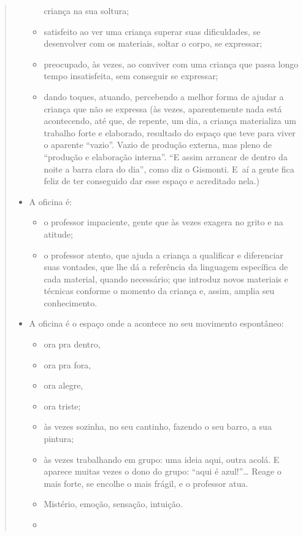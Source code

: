 \begin{quote}
\begin{itemize}
\begin{itemize}
    criança na sua soltura;
  \item
    satisfeito ao ver uma criança superar suas dificuldades, se
    desenvolver com os materiais, soltar o corpo, se expressar;
  \item
    preocupado, às vezes, ao conviver com uma criança que passa longo
    tempo insatisfeita, sem conseguir se expressar;
  \item
    dando toques, atuando, percebendo a melhor forma de ajudar a criança
    que não se expressa (às vezes, aparentemente nada está acontecendo,
    até que, de repente, um dia, a criança materializa um trabalho forte
    e elaborado, resultado do espaço que teve para viver o aparente
    ``vazio''. Vazio de produção externa, mas pleno de ``produção e
    elaboração interna''. ``E assim arrancar de dentro da noite a barra
    clara do dia'', como diz o Gismonti. E~aí a gente fica feliz de ter
    conseguido dar esse espaço e acreditado nela.)
  \end{itemize}
\item
  A oficina é:
  \begin{itemize}
  \item
    o professor impaciente, gente que às vezes exagera no grito e na
    atitude;
  \item
    o professor atento, que ajuda a criança a qualificar e diferenciar
    suas vontades, que lhe dá a referência da linguagem específica de
    cada material, quando necessário; que introduz novos materiais e
    técnicas conforme o momento da criança e, assim, amplia seu
    conhecimento.
  \end{itemize}
\item
  A oficina é o espaço onde a  acontece no seu movimento
  espontâneo:
  \begin{itemize}
  \item
    ora pra dentro,
  \item
    ora pra fora,
  \item
    ora alegre,
  \item
    ora triste;
  \item
    às vezes sozinha, no seu cantinho, fazendo o seu barro, a sua
    pintura;
  \item
    às vezes trabalhando em grupo: uma ideia aqui, outra acolá. E
    aparece muitas vezes o dono do grupo: ``aqui é azul!''… Reage o mais
    forte, se encolhe o mais frágil, e o professor atua.
  \item
    Mistério, emoção, sensação, intuição.
  \item

\end{itemize}
\end{itemize}
\end{quote}
